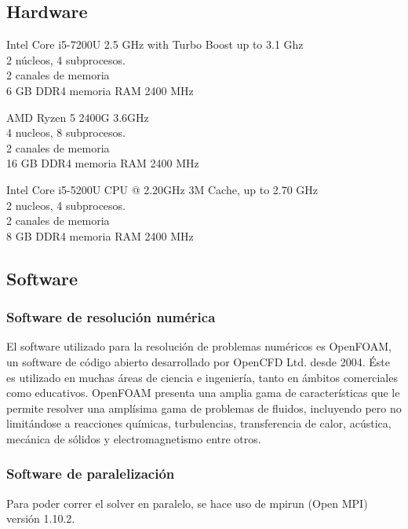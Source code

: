 \documentclass{article}
\begin{document}
\subsection{Hardware}
\begin{description}[align=right]
    \item [PC1] Intel Core i5-7200U 2.5 GHz with Turbo Boost up to 3.1 Ghz\\
        2 núcleos, 4 subprocesos.\\
        2 canales de memoria\\
        6 GB DDR4 memoria RAM  2400 MHz
    \item [PC2] AMD Ryzen 5 2400G 3.6GHz\\
        4 nucleos, 8 subprocesos.\\
        2 canales de memoria\\
        16 GB DDR4 memoria RAM 2400 MHz
    \item [PC3] Intel Core i5-5200U CPU @ 2.20GHz 3M Cache, up to 2.70 GHz\\
        2 nucleos, 4 subprocesos.\\
        2 canales de memoria\\
        8 GB DDR4 memoria RAM 2400 MHz
\end{description}
\subsection{Software}
\subsubsection{Software de resolución numérica}
El software utilizado para la resolución de problemas numéricos es OpenFOAM, un software de código abierto desarrollado por OpenCFD Ltd. desde 2004. Éste es utilizado en muchas áreas de ciencia e ingeniería, tanto en ámbitos comerciales como educativos. OpenFOAM presenta una amplia gama de características que le permite resolver una amplísima gama de problemas de fluidos, incluyendo pero no limitándose a reacciones químicas, turbulencias, transferencia de calor, acústica, mecánica de sólidos y electromagnetismo entre otros. 

\subsubsection{Software de paralelización}
Para poder correr el solver en paralelo, se hace uso de mpirun (Open MPI) versión 1.10.2. 
\end{document}
